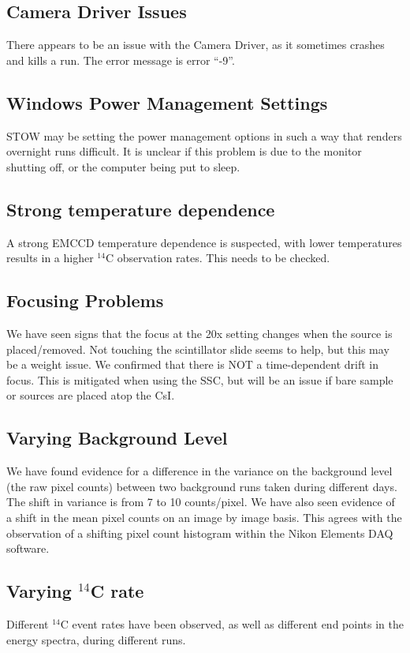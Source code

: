 \documentclass[11pt]{article}
\newcommand{\nuc}[2]{\ensuremath{^{#1}}#2}
\begin{document}
\subsection{Camera Driver Issues}
There appears to be an issue with the Camera Driver, as it sometimes crashes and kills a run. The error message is error ``-9''.

\subsection{Windows Power Management Settings}
STOW may be setting the power management options in such a way that renders overnight runs difficult. It is unclear if this problem is due to the monitor shutting off, or the computer being put to sleep.


\subsection{Strong temperature dependence}
A strong EMCCD temperature dependence is suspected, with lower temperatures results in a higher \nuc{14}{C} observation rates. This needs to be checked. 

\subsection{Focusing Problems}
We have seen signs that the focus at the 20x setting changes when the source is placed/removed. Not touching the scintillator slide seems to help, but this may be a weight issue.
We confirmed that there is NOT a time-dependent drift in focus. This is mitigated when using the SSC, but will be an issue if bare sample or sources are placed atop the CsI. 

\subsection{Varying Background Level}
We have found evidence for a difference in the variance on the background level (the raw pixel counts) between two background runs taken during different days. 
The shift in variance is from 7 to 10 counts/pixel. We have also seen evidence of a shift in the mean pixel counts on an image by image basis. This agrees with
the observation of a shifting pixel count histogram within the Nikon Elements DAQ software.

\subsection{Varying \nuc{14}{C} rate}
Different \nuc{14}{C} event rates have been observed, as well as different end points in the energy spectra, during different runs. 
\end{document}
